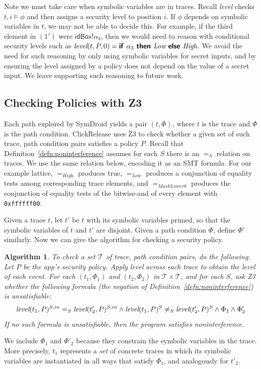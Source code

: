 \documentclass{llncs}
\newcommand{\code}[1]{\textsf{#1}} %
\newcommand{\bcode}[1]{\texttt{#1}}
\newtheorem{algorithm}{Algorithm}
\newcommand{\toolname}{ClickRelease\xspace}
\newcommand{\tr}{t\xspace}
\newcommand{\tset}{\ensuremath{\mathcal{T}}\xspace}
\newcommand{\tlevel}[3]{\textit{level}(#1, #2, #3)}
\newcommand{\tleveltr}[2]{\textit{level}(#1, #2)}
\begin{document}
Note we must take care when symbolic variables are in traces.
Recall \textit{level} checks $t,i \models \phi$ and
then assigns a security level to position $i$. If $\phi$
depends on symbolic variables in $t$, we may not be able to
decide this. For example, if the third element in $(1')$ were
$\code{idBox}!\alpha_3$, then we would need to reason with
conditional security levels such as
$\tlevel{\tr}{P}{0} =\textsf{\textbf{if }} \alpha_3 \textsf{\textbf{ then }} \textit{Low}
\textsf{\textbf{ else }} \textit{High}$. We
avoid the need for such reasoning by only using symbolic variables for
secret inputs, and by ensuring the level assigned by a policy does not
depend on the value of a secret input. We leave supporting such
reasoning to future work.

\subsection{Checking Policies with Z3}

Each path explored by SymDroid yields a pair $(t, \Phi)$, where $t$ is
the trace and $\Phi$ is the path condition. \toolname{} uses Z3 to check whether a given set
of such trace, path condition pairs satisfies a policy $P$. Recall that
Definition~\ref{defn:noninterference} assumes for each $S$ there is an
$=_S$ relation on traces. We use the same relation below, encoding it
as an SMT formula. For our example lattice, $=_\textit{High}$ produces
\code{true}, $=_\textit{Low}$ produces a conjunction of equality tests
among corresponding trace elements, and $=_\textit{MaskLower8}$
produces the conjunction of equality tests of the bitwise-and of every
element with \bcode{0xffffff00}.

Given a trace
$t$, let $t'$ be $t$ with its symbolic variables primed, so that the
symbolic variables of $t$ and $t'$ are disjoint. Given a path
condition $\Phi$, define $\Phi'$ similarly. Now we can give the
algorithm for checking a security policy.

\begin{algorithm}
  To check a set $\tset$ of trace, path condition pairs, do the
  following. Let $P$ be the app's security policy. Apply \emph{level}
  across each trace to obtain the level of each event.  For each
  $(t_1, \Phi_1)$ and $(t_2, \Phi_2)$ in $\tset\times\tset$, and for
  each $S$, ask Z3 whether the following formula (the negation of
  Definition~\ref{defn:noninterference}) is unsatisfiable:
  \begin{displaymath}
      \tleveltr{\tr_1}{P}^{S,in} =_S \tleveltr{\tr_2'}{P}^{S,in} \land
      \tleveltr{\tr_1}{P}^S \neq_S \tleveltr{\tr_2'}{P}^S \land
      \Phi_1 \land \Phi_2' \\
  \end{displaymath}
  If no such formula is unsatisfiable, then the program satisfies noninterference.
\end{algorithm}
%
We include $\Phi_1$ and $\Phi'_2$ because they
constrain the symbolic variables in the trace. More precisely,
$\tr_1$ represents a \emph{set} of concrete traces in which its symbolic
variables are instantiated in all ways that satisfy $\Phi_1$,
and analogously for $\tr'_2$.
\end{document}
